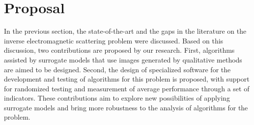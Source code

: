	\section{Proposal}\label{chap:proposed-methodology:proposal}
	
		
		In the previous section, the state-of-the-art and the gaps in the literature on the inverse electromagnetic scattering problem were discussed. Based on this discussion, two contributions are proposed by our research. First, algorithms assisted by surrogate models that use images generated by qualitative methods are aimed to be designed. Second, the design of specialized software for the development and testing of algorithms for this problem is proposed, with support for randomized testing and measurement of average performance through a set of indicators. These contributions aim to explore new possibilities of applying surrogate models and bring more robustness to the analysis of algorithms for the problem.
		
